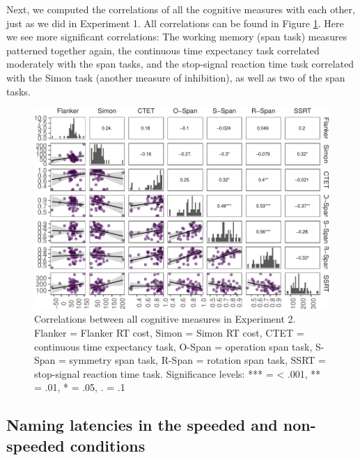\documentclass[
  man,floatsintext]{apa6}
\begin{document}
Next, we computed the correlations of all the cognitive measures with each other, just as we did in Experiment 1. All correlations can be found in Figure \ref{fig:cogskillscorE2}. Here we see more significant correlations: The working memory (span task) measures patterned together again, the continuous time expectancy task correlated moderately with the span tasks, and the stop-signal reaction time task correlated with the Simon task (another measure of inhibition), as well as two of the span tasks.



\begin{figure}
\centering
\includegraphics{task_difficulty_ind_dif_files/figure-latex/cogskillscorE2-1.pdf}
\caption{\label{fig:cogskillscorE2}Correlations between all cognitive measures in Experiment 2. Flanker = Flanker RT cost, Simon = Simon RT cost, CTET = continuous time expectancy task, O-Span = operation span task, S-Span = symmetry span task, R-Span = rotation span task, SSRT = stop-signal reaction time task. Significance levels: *** = \textless{} .001, ** = .01, * = .05, . = .1}
\end{figure}

\hypertarget{naming-latencies-in-the-speeded-and-non-speeded-conditions}{%
\subsection{Naming latencies in the speeded and non-speeded conditions}\label{naming-latencies-in-the-speeded-and-non-speeded-conditions}}
\end{document}
